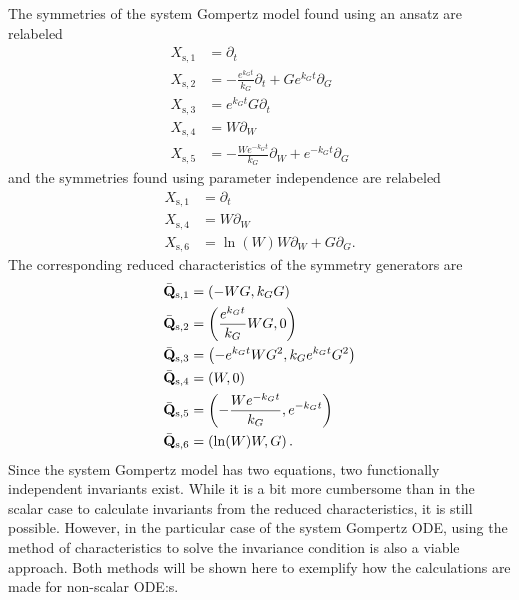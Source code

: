 The symmetries of the system Gompertz model found using an ansatz are relabeled
\begin{align}
  X_{\text{s},1} &= \partial_t \\
  X_{\text{s},2} &= - \frac{e^{k_{G} t}}{k_{G}} \partial_t + G e^{k_{G} t} \partial_G \\
  X_{\text{s},3} &= e^{k_{G} t} G \partial_t \\
  X_{\text{s},4} &= W \partial_W \\
  X_{\text{s},5} &= - \frac{W e^{- k_{G} t}}{k_{G}} \partial_W + e^{- k_{G} t} \partial_G
\end{align}
and the symmetries found using parameter independence are relabeled
\begin{align}
  X_{\text{s},1} &= \partial_t \\
  X_{\text{s},4} &= W \partial_W \\
  X_{\text{s},6} &= \ln(W) W \partial_W + G \partial_G.
\end{align}
The corresponding reduced characteristics of the symmetry generators are
\begin{align}
  \bar{\vb{Q}}_{\text{s},1} &= \left(-W G, k_G G\right) \\
  \bar{\vb{Q}}_{\text{s},2} &= \left(\frac{e^{k_{G} t}}{k_{G}} W G, 0\right) \\
  \bar{\vb{Q}}_{\text{s},3} &= \left(- e^{k_{G} t} W G^2, k_G e^{k_{G} t} G^2\right) \\
  \bar{\vb{Q}}_{\text{s},4} &= \left(W, 0\right) \\
  \bar{\vb{Q}}_{\text{s},5} &= \left(- \frac{W e^{- k_{G} t}}{k_{G}}, e^{- k_{G} t} \right) \\
  \bar{\vb{Q}}_{\text{s},6} &= \left(\ln(W) W, G\right).
\end{align}
Since the system Gompertz model has two equations, two functionally independent invariants exist.
While it is a bit more cumbersome than in the scalar case to calculate invariants from the reduced characteristics, it is still possible.
However, in the particular case of the system Gompertz ODE, using the method of characteristics to solve the invariance condition is also a viable approach.
Both methods will be shown here to exemplify how the calculations are made for non-scalar ODE:s.

